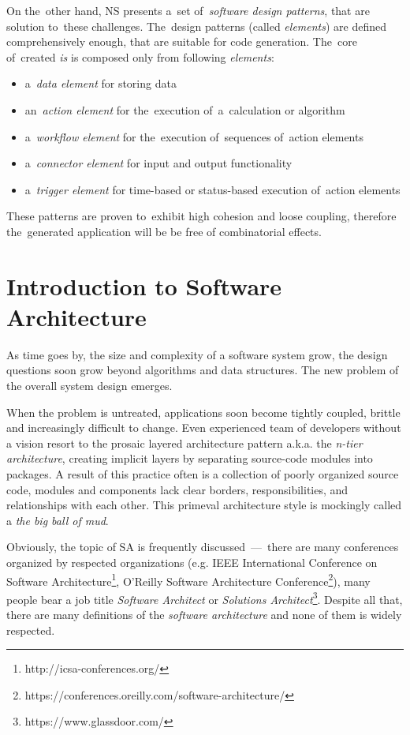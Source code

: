 \documentclass[thesis=M,english,hidelinks]{FITthesis}[2012/10/20]
\begin{document}
On the~other hand, \acrshort{NS} presents a~set of~\emph{software design patterns}, that are solution to~these challenges. The~design patterns (called \emph{elements}) are defined comprehensively enough, that are suitable for code generation. The~core of~created \emph{is} is composed only from following \emph{elements}:

\begin{itemize}
	\item a~\emph{data element} for storing data
	\item an~\emph{action element} for the~execution of~a~calculation or algorithm
	\item a~\emph{workflow element} for the~execution of~sequences of~action elements
	\item a~\emph{connector element} for input and output functionality
	\item a~\emph{trigger element} for time-based or status-based execution of~action elements
\end{itemize}

These patterns are proven to~exhibit high cohesion and loose coupling, therefore the~generated application will be be free of combinatorial effects.

% 
% 

\section{Introduction to Software Architecture}
As time goes by, the size and complexity of a software system grow, the design questions soon grow beyond algorithms and data structures. The new problem of the overall system design emerges.

When the problem is untreated, applications soon become tightly coupled, brittle and increasingly difficult to change. Even experienced team of developers without a vision resort to the prosaic layered architecture pattern a.k.a. the \textit{n-tier architecture}, creating implicit layers by separating source-code modules into packages. A result of this practice often is a collection of poorly organized source code, modules and components lack clear borders, responsibilities, and relationships with each other. This primeval architecture style is mockingly called a \textit{the big ball of mud}\cite{big-ball-mud}.

Obviously, the topic of \acrfull{SA} is frequently discussed~---~there are many conferences organized by respected organizations (e.g. IEEE International Conference on Software Architecture\footnote{http://icsa-conferences.org/}, O'Reilly Software Architecture Conference\footnote{https://conferences.oreilly.com/software-architecture/}), many people bear a job title \textit{Software Architect} or \textit{Solutions Architect}\footnote{https://www.glassdoor.com/}. Despite all that, there are many definitions of the \textit{software architecture} and none of them is widely respected.
\end{document}
